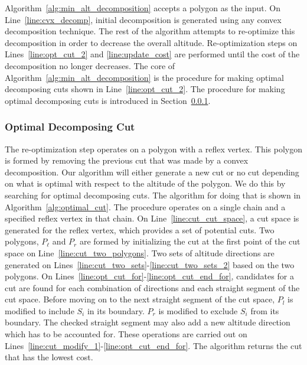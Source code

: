 \documentclass[../main.tex]{subfiles}
\begin{document}
Algorithm~\ref{alg:min_alt_decomposition} accepts a polygon as the input. On Line~\ref{line:cvx_decomp}, initial decomposition is generated using any convex decomposition technique. The rest of the algorithm attempts to re-optimize this decomposition in order to decrease the overall altitude. Re-optimization steps on Lines~\ref{line:opt_cut_2} and \ref{line:update_cost} are performed until the cost of the decomposition no longer decreases. The core of Algorithm~\ref{alg:min_alt_decomposition} is the procedure for making optimal decomposing cuts shown in Line~\ref{line:opt_cut_2}. The procedure for making optimal decomposing cuts is introduced in Section~\ref{sec:alt_cut_decomposition}.

\subsubsection{Optimal Decomposing Cut}
\label{sec:alt_cut_decomposition}
The re-optimization step operates on a polygon with a reflex vertex. This polygon is formed by removing the previous cut that was made by a convex decomposition. Our algorithm will either generate a new cut or no cut depending on what is optimal with respect to the altitude of the polygon. We do this by searching for optimal decomposing cuts. The algorithm for doing that is shown in Algorithm~\ref{alg:optimal_cut}. The procedure operates on a single chain and a specified reflex vertex in that chain. On Line~\ref{line:cut_cut_space}, a cut space is generated for the reflex vertex, which provides a set of potential cuts. Two polygons, $P_{\ell}$ and $P_r$ are formed by initializing the cut at the first point of the cut space on Line~\ref{line:cut_two_polygons}. Two sets of altitude directions are generated on Lines~\ref{line:cut_two_sets}-\ref{line:cut_two_sets_2} based on the two polygons. On Lines~\ref{line:opt_cut_for}-\ref{line:opt_cut_end_for}, candidates for a cut are found for each combination of directions and each straight segment of the cut space. Before moving on to the next straight segment of the cut space, $P_l$ is modified to include $S_i$ in its boundary. $P_r$ is modified to exclude $S_i$ from its boundary. The checked straight segment may also add a new altitude direction which has to be accounted for. These operations are carried out on Lines~\ref{line:cut_modify_1}-\ref{line:opt_cut_end_for}. The algorithm returns the cut that has the lowest cost.
\end{document}
